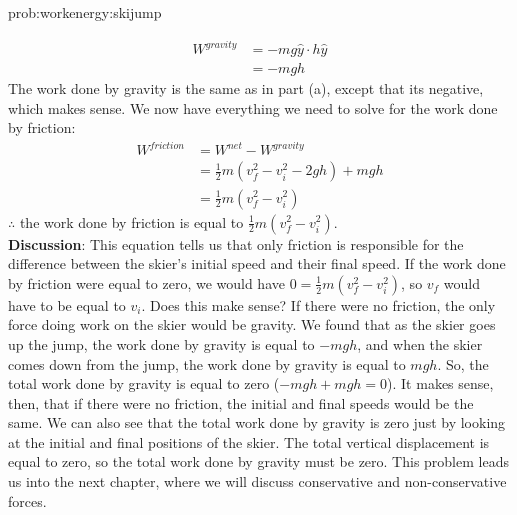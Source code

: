 \begin{solution}{prob:workenergy:skijump}
\begin{enumerate}[label=\alph*)]
\begin{align*}
W^{gravity}&=-mg\hat y \cdot h\hat y\\
&=-mgh
\end{align*}
The work done by gravity is the same as in part (a), except that its negative, which makes sense. We now have everything we need to solve for the work done by friction:
\begin{align*}
W^{friction}&=W^{net}-W^{gravity}\\
&=\frac{1}{2}m(v_f^2-v_i^2-2gh)+mgh\\
&=\frac{1}{2}m(v_f^2-v_i^2)
\end{align*}
$\therefore$ the work done by friction is equal to $\frac{1}{2}m(v_f^2-v_i^2)$. \\

\textbf{Discussion}: This equation tells us that only friction is responsible for the difference between the skier's initial speed and their final speed. If the work done by friction were equal to zero, we would have $0=\frac{1}{2}m(v_f^2-v_i^2)$, so $v_f$ would have to be equal to $v_i$. Does this make sense? If there were no friction, the only force doing work on the skier would be gravity. We found that as the skier goes up the jump, the work done by gravity is equal to $-mgh$, and when the skier comes down from the jump, the work done by gravity is equal to $mgh$. So, the total work done by gravity is equal to zero ($-mgh+mgh=0$). It makes sense, then, that if there were no friction, the initial and final speeds would be the same. We can also see that the total work done by gravity is zero just by looking at the initial and final positions of the skier. The total vertical displacement is equal to zero, so the total work done by gravity must be zero. This problem leads us into the next chapter, where we will discuss conservative and non-conservative forces. \\
\end{enumerate}
\end{solution}

